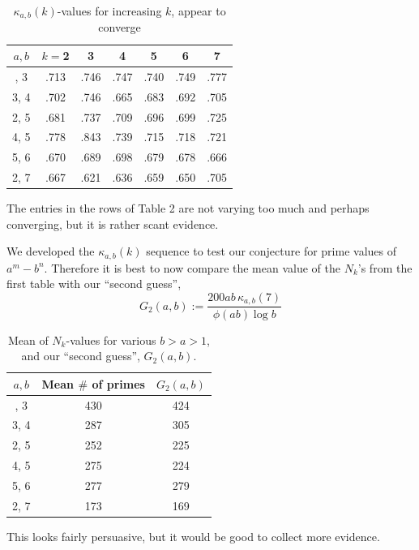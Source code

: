 \documentclass[12pt, a4paper,  reqno, english]{amsart}%
\numberwithin{equation}{section}
\theoremstyle{definition}
\begin{document}
\begin{table}[ht]
\begin{center}
\begin{tabular}{|  c | c c c c c c  | }
\hline\newline
 $a,b$  & $k=$2& 3 & 4 & 5 & 6 &  7 \\
\hline\newline
2, 3 &  .713 & .746 & .747 & .740 & .749 & .777   \\
3, 4 &   .702 & .746 & .665 & .683 & .692 & .705  \\
2, 5 &  .681 & .737 & .709 & .696 & .699 & .725  \\
4, 5 & .778 & .843 & .739 & .715 & .718 & .721   \\
5, 6 &  .670 & .689 & .698 & .679 & .678 & .666     \\
2, 7&  .667 & .621 & .636 & .659 & .650 & .705  \\
\hline 
\end{tabular}
    \end{center} \smallskip
     \caption{$\kappa_{a,b}(k)$-values for increasing $k$, appear to converge}
    \end{table}

\noindent    The entries in the rows of Table 2 are not varying too much and perhaps converging,   but it is  rather scant evidence.

We developed the $\kappa_{a,b}(k)$ sequence to test our conjecture for prime values of $a^m-b^n$. Therefore it is best to now 
 compare the mean value of the $N_k$'s from the first table with our ``second guess'',
\[
G_2(a,b):=\frac{200ab\, \kappa_{a,b}(7)}{\phi(ab) \log b} 
\]
 

 \begin{table}[ht]
\begin{center}
\begin{tabular}{|  c | c | c   | }
\hline\newline
 $a,b$  & Mean $\#$ of primes &  $G_2(a,b)$ \\
\hline\newline
 2, 3 &  430 & 424   \\
3, 4 &   287  & 305  \\
2, 5 &  252 & 225  \\
4, 5 & 275 & 224   \\
5, 6 &  277 &  279     \\
2, 7&  173 & 169  \\
\hline 
\end{tabular}
    \end{center} \smallskip
      \caption{Mean of $N_k$-values for various   $b>a>1$, and our ``second guess'', $G_2(a,b)$.}
    \end{table}                           
 This looks fairly persuasive, but it would be good to collect more evidence.                    
   
\end{document}
